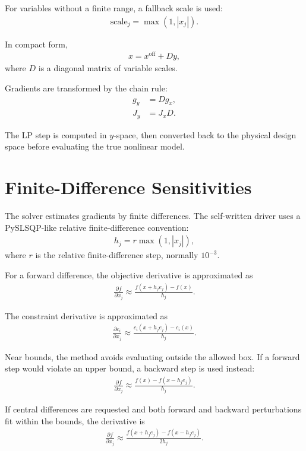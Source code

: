 \documentclass[11pt,a4paper]{article}
\begin{document}
For variables without a finite range, a fallback scale is used:
\begin{align}
    \text{scale}_j = \max(1, |x_j|).
\end{align}

In compact form,
\begin{align}
    x = x^{\text{off}} + D y,
\end{align}
where \(D\) is a diagonal matrix of variable scales.

Gradients are transformed by the chain rule:
\begin{align}
    g_y &= D g_x, \\
    J_y &= J_x D.
\end{align}

The LP step is computed in \(y\)-space, then converted back to the physical
design space before evaluating the true nonlinear model.

\section{Finite-Difference Sensitivities}

The solver estimates gradients by finite differences. The self-written driver
uses a PySLSQP-like relative finite-difference convention:
\begin{align}
    h_j = r \max(1, |x_j|),
\end{align}
where \(r\) is the relative finite-difference step, normally \(10^{-3}\).

For a forward difference, the objective derivative is approximated as
\begin{align}
    \frac{\partial f}{\partial x_j}
    \approx
    \frac{f(x + h_j e_j) - f(x)}{h_j}.
\end{align}

The constraint derivative is approximated as
\begin{align}
    \frac{\partial c_i}{\partial x_j}
    \approx
    \frac{c_i(x + h_j e_j) - c_i(x)}{h_j}.
\end{align}

Near bounds, the method avoids evaluating outside the allowed box. If a forward
step would violate an upper bound, a backward step is used instead:
\begin{align}
    \frac{\partial f}{\partial x_j}
    \approx
    \frac{f(x) - f(x - h_j e_j)}{h_j}.
\end{align}

If central differences are requested and both forward and backward perturbations
fit within the bounds, the derivative is
\begin{align}
    \frac{\partial f}{\partial x_j}
    \approx
    \frac{f(x + h_j e_j) - f(x - h_j e_j)}{2h_j}.
\end{align}
\end{document}
